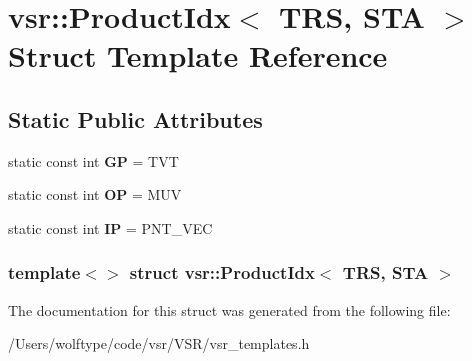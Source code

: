 \hypertarget{structvsr_1_1_product_idx_3_01_t_r_s_00_01_s_t_a_01_4}{\section{vsr\-:\-:Product\-Idx$<$ T\-R\-S, S\-T\-A $>$ Struct Template Reference}
\label{structvsr_1_1_product_idx_3_01_t_r_s_00_01_s_t_a_01_4}
}
\subsection*{Static Public Attributes}
\begin{DoxyCompactItemize}
\item 
\hypertarget{structvsr_1_1_product_idx_3_01_t_r_s_00_01_s_t_a_01_4_ab8cc88bcd67b8c7e2214a280302fad85}{static const int {\bfseries G\-P} = T\-V\-T}\label{structvsr_1_1_product_idx_3_01_t_r_s_00_01_s_t_a_01_4_ab8cc88bcd67b8c7e2214a280302fad85}

\item 
\hypertarget{structvsr_1_1_product_idx_3_01_t_r_s_00_01_s_t_a_01_4_a3bcb978a81123d6fc6ed4436e533fc31}{static const int {\bfseries O\-P} = M\-U\-V}\label{structvsr_1_1_product_idx_3_01_t_r_s_00_01_s_t_a_01_4_a3bcb978a81123d6fc6ed4436e533fc31}

\item 
\hypertarget{structvsr_1_1_product_idx_3_01_t_r_s_00_01_s_t_a_01_4_a04a55467615882b5ed828d76e7eb6339}{static const int {\bfseries I\-P} = P\-N\-T\-\_\-\-V\-E\-C}\label{structvsr_1_1_product_idx_3_01_t_r_s_00_01_s_t_a_01_4_a04a55467615882b5ed828d76e7eb6339}

\end{DoxyCompactItemize}
\subsubsection*{template$<$$>$ struct vsr\-::\-Product\-Idx$<$ T\-R\-S, S\-T\-A $>$}



The documentation for this struct was generated from the following file\-:\begin{DoxyCompactItemize}
\item 
/\-Users/wolftype/code/vsr/\-V\-S\-R/vsr\-\_\-templates.\-h\end{DoxyCompactItemize}
